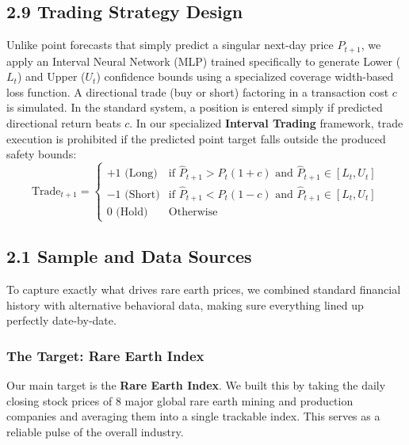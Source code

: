 \documentclass[11pt,a4paper]{article}
\begin{document}
\subsection{2.9 Trading Strategy Design}
Unlike point forecasts that simply predict a singular next-day price $P_{t+1}$, we apply an Interval Neural Network (MLP) trained specifically to generate Lower ($L_t$) and Upper ($U_t$) confidence bounds using a specialized coverage width-based loss function. 
A directional trade (buy or short) factoring in a transaction cost $c$ is simulated. In the standard system, a position is entered simply if predicted directional return beats $c$. In our specialized \textbf{Interval Trading} framework, trade execution is prohibited if the predicted point target falls outside the produced safety bounds:
\begin{equation}
\text{Trade}_{t+1} = \begin{cases}
+1 \text{ (Long)} & \text{if } \hat{P}_{t+1} > P_t (1+c) \text{ and } \hat{P}_{t+1} \in [L_{t}, U_{t}] \\
-1 \text{ (Short)} & \text{if } \hat{P}_{t+1} < P_t (1-c) \text{ and } \hat{P}_{t+1} \in [L_{t}, U_{t}] \\
0 \text{ (Hold)} & \text{Otherwise}
\end{cases}
\end{equation}

\subsection{2.1 Sample and Data Sources}

To capture exactly what drives rare earth prices, we combined standard financial history with alternative behavioral data, making sure everything lined up perfectly date-by-date.

\subsubsection{The Target: Rare Earth Index}
Our main target is the \textbf{Rare Earth Index}. We built this by taking the daily closing stock prices of 8 major global rare earth mining and production companies and averaging them into a single trackable index. This serves as a reliable pulse of the overall industry.
\end{document}
